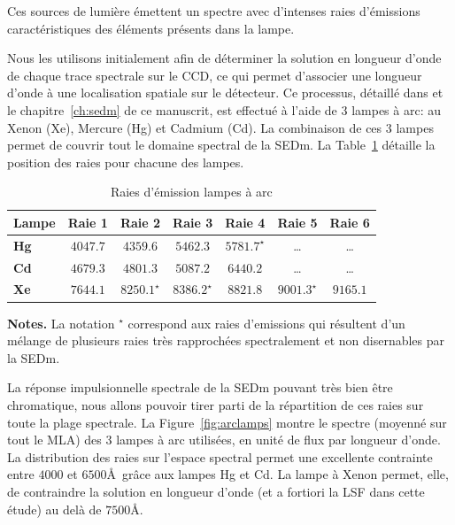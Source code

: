 \documentclass[../main/main.tex]{subfiles}
\begin{document}
Ces sources de lumière émettent un spectre avec d'intenses raies
d'émissions caractéristiques des éléments présents dans la lampe.

Nous les utilisons initialement afin de déterminer la solution en longueur
d'onde de chaque trace spectrale sur le CCD, ce qui permet d'associer une longueur d'onde à une localisation spatiale
sur le détecteur.
Ce processus, détaillé dans \citet{pysedm} et le chapitre~\ref{ch:sedm}
de ce manuscrit, est effectué à l'aide de $3$ lampes à arc: au Xenon (Xe),
Mercure (Hg) et Cadmium (Cd). La combinaison de ces $3$ lampes permet de
couvrir tout le domaine spectral de la SEDm. La
Table~\ref{tab:linearclamp} détaille la position des raies pour chacune
des lampes.

\begin{table}[ht]
  \centerfloat
  \renewcommand{\arraystretch}{1.5}
    \begin{threeparttable}
        \caption{Raies d'émission lampes à arc}
        \label{tab:linearclamp}
        
        \begin{tabular}{lcccccc}
        \toprule
          \textbf{Lampe} &  Raie 1 &  Raie 2 & Raie 3 & Raie 4 & Raie 5 & Raie 6 \\
        \midrule
          \textbf{Hg} & $4047.7$  &  $4359.6$  &  $5462.3$  &  $5781.7^{\star}$  &  \ldots  & \ldots \\
          \textbf{Cd} & $4679.3$  & $4801.3$   & $5087.2$   & $6440.2$ &  \ldots  &  \ldots  \\
          \textbf{Xe} & $7644.1$  & $8250.1^{\star}$  & $8386.2^{\star}$  & $8821.8$  &  $9001.3^{\star}$  &  $9165.1$ \\
          \bottomrule
        \end{tabular}
        \begin{tablenotes}[flushleft]
        \item \textbf{Notes.} La notation $ ^{\star}$ correspond aux
          raies d'emissions qui résultent d'un mélange de plusieurs raies très
          rapprochées spectralement et non disernables par la SEDm.
        \end{tablenotes}
    \end{threeparttable}
  \end{table}

La réponse impulsionnelle spectrale de la SEDm pouvant très bien être chromatique, nous allons
pouvoir tirer parti de la répartition de ces raies sur toute la plage
spectrale. La Figure~\ref{fig:arclamps} montre le spectre (moyenné sur
tout le MLA) des $3$ lampes à arc utilisées, en unité de flux par
longueur d'onde. La distribution des raies sur l'espace spectral permet
une excellente contrainte entre $4000$ et $6500$\AA\ grâce aux lampes Hg et
Cd. La lampe à Xenon permet, elle, de contraindre la solution en longueur
d'onde (et a fortiori la LSF dans cette étude) au delà de $7500$\AA.
\end{document}
